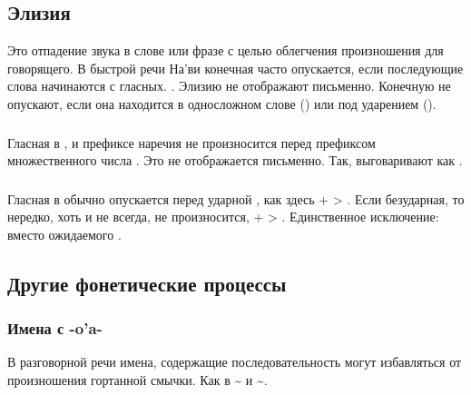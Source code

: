 \subsection{Элизия} Это отпадение звука в слове или фразе с целью облегчения произношения для говорящего. В быстрой речи На'ви конечная  часто опускается, если последующие слова начинаются с гласных.  . Элизию не отображают письменно.
Конечную  не опускают, если она находится в односложном слове () или под ударением ().

\subsubsection{} Гласная  в ,  и префиксе наречия  не произносится перед префиксом множественного числа . Это не отображается письменно.  Так,   выговаривают как
. \label{l-and-s:elision-i}

\subsubsection{} Гласная в  обычно опускается перед ударной , как здесь  +  > . Если 
безударная, то нередко, хоть и не всегда, не произносится,  +
 > . Единственное исключение:  вместо ожидаемого .

\subsection{Другие фонетические процессы}

\subsubsection{Имена с -o'a-} \label{names-with-oa}
В разговорной речи имена, содержащие последовательность  могут избавляться от произношения гортанной смычки. Как в  \textasciitilde{}  
и  \textasciitilde {}.


